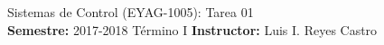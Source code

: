 \documentclass[ a4paper, twoside, 11pt]{article}
\newcommand{\numero}{01}
\begin{document}
\allowdisplaybreaks



\begin{center}
\Large Sistemas de Control (EYAG-1005): Tarea \numero \\[1ex]
\small \textbf{Semestre:} 2017-2018 T\'ermino I \qquad
\textbf{Instructor:} Luis I. Reyes Castro
\end{center}
\fullskip

%

\begin{problem}


\end{problem}
\vspace{\baselineskip}
\end{document}
